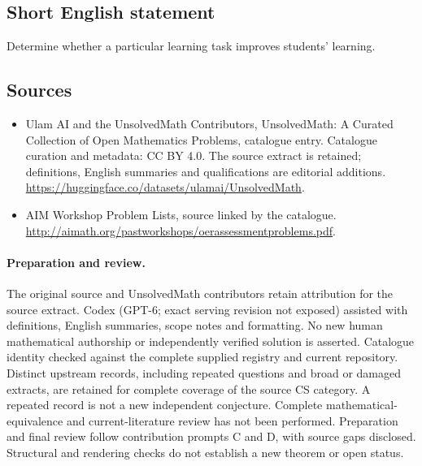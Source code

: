 \documentclass[11pt]{article}
\begin{document}
\subsection{Short English statement}
Determine whether a particular learning task improves students' learning.
\subsection{Sources}
\begin{itemize}
\item[\hypertarget{source:statement:1}{S1}] Ulam AI and the UnsolvedMath Contributors, UnsolvedMath: A Curated Collection of Open Mathematics Problems, catalogue entry. Catalogue curation and metadata: CC BY 4.0. The source extract is retained; definitions, English summaries and qualifications are editorial additions.
\url{https://huggingface.co/datasets/ulamai/UnsolvedMath}.
\item[\hypertarget{source:statement:2}{S2}] AIM Workshop Problem Lists, source linked by the catalogue.
\url{http://aimath.org/pastworkshops/oerassessmentproblems.pdf}.
\end{itemize}
\paragraph{Preparation and review.}
The original source and UnsolvedMath contributors retain attribution for the source extract. Codex (GPT-6; exact serving revision not exposed) assisted with definitions, English summaries, scope notes and formatting. No new human mathematical authorship or independently verified solution is asserted. Catalogue identity checked against the complete supplied registry and current repository. Distinct upstream records, including repeated questions and broad or damaged extracts, are retained for complete coverage of the source CS category. A repeated record is not a new independent conjecture. Complete mathematical-equivalence and current-literature review has not been performed. Preparation and final review follow contribution prompts C and D, with source gaps disclosed. Structural and rendering checks do not establish a new theorem or open status.
\label{end:statement}
\end{document}
